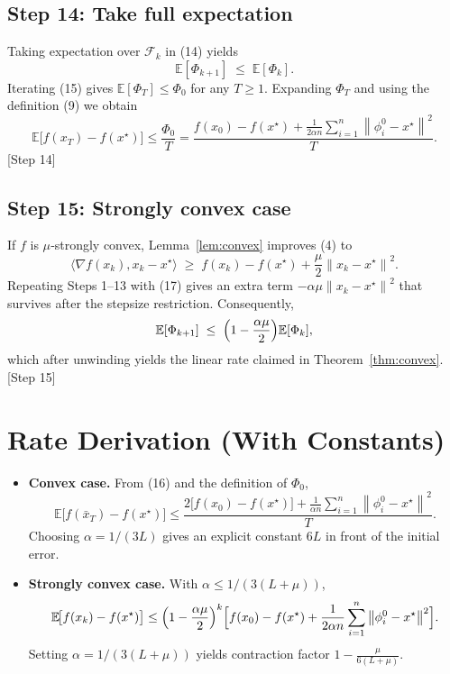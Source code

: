 \documentclass{article}
\newcommand{\E}{\mathbb{E}}
\newcommand{\norm}[1]{\left\|#1\right\|}
\newcommand{\grad}{\nabla}
\begin{document}
\subsection*{Step 14: Take full expectation}
Taking expectation over $\mathcal{F}_k$ in (14) yields
\[
\E[\Phi_{k+1}] \;\le\; \E[\Phi_k] . \tag{15}
\]
Iterating (15) gives $\E[\Phi_T]\le\Phi_0$ for any $T\ge1$.
Expanding $\Phi_T$ and using the definition (9) we obtain
\[
\E\!\bigl[f(x_T)-f(x^\star)\bigr]
 \le \frac{\Phi_0}{T}
 = \frac{ f(x_0)-f(x^\star)
        +\frac{1}{2\alpha n}\sum_{i=1}^{n}\norm{\phi_i^0-x^\star}^{2}}
        {T}. \tag{16}
\]
[Step 14]

\subsection*{Step 15: Strongly convex case}
If $f$ is $\mu$‑strongly convex, Lemma~\ref{lem:convex} improves (4) to
\[
\langle \grad f(x_k),x_k-x^\star\rangle
 \;\ge\; f(x_k)-f(x^\star)+\frac{\mu}{2}\norm{x_k-x^\star}^{2}. \tag{17}
\]
Repeating Steps 1–13 with (17) gives an extra term $-\alpha\mu\norm{x_k-x^\star}^{2}$
that survives after the stepsize restriction. Consequently,
\[
\E[\Phi_{k+1}] \;\le\;
\Bigl(1-\frac{\alpha\mu}{2}\Bigr)\E[\Phi_k],
\]
which after unwinding yields the linear rate claimed in Theorem~\ref{thm:convex}.
[Step 15]

\section*{Rate Derivation (With Constants)}
\begin{itemize}
\item \textbf{Convex case.} From (16) and the definition of $\Phi_0$,
\[
\E\!\bigl[f(\bar x_T)-f(x^\star)\bigr]
 \le \frac{2\bigl[f(x_0)-f(x^\star)\bigr]
          +\frac{1}{\alpha n}\sum_{i=1}^{n}\norm{\phi_i^0-x^\star}^{2}}{T}.
\]
Choosing $\alpha=1/(3L)$ gives an explicit constant $6L$ in front of the
initial error.
\item \textbf{Strongly convex case.} With $\alpha\le 1/(3(L+\mu))$,
\[
\E\!\bigl[f(x_k)-f(x^\star)\bigr]
 \le \Bigl(1-\frac{\alpha\mu}{2}\Bigr)^{k}
    \Bigl[ f(x_0)-f(x^\star)+\frac{1}{2\alpha n}\sum_{i=1}^{n}\norm{\phi_i^0-x^\star}^{2}\Bigr].
\]
Setting $\alpha=1/(3(L+\mu))$ yields contraction factor
$1-\frac{\mu}{6(L+\mu)}$.
\end{itemize}
\end{document}
